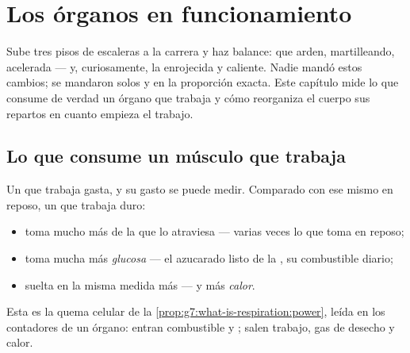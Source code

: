 \chapter{Los órganos en funcionamiento}\label{ch:g7:organs-at-work}

Sube tres pisos de escaleras a la carrera y haz balance:  que
arden,  martilleando,  acelerada --- y, curiosamente,
la  enrojecida y caliente. Nadie mandó estos cambios; se mandaron
solos y en la proporción exacta. Este capítulo mide lo que consume de
verdad un órgano que trabaja y cómo reorganiza el cuerpo sus repartos
en cuanto empieza el trabajo.

\section{Lo que consume un músculo que trabaja}

\begin{proposition}\label{prop:g7:organs-at-work:bill}
Un  que trabaja gasta, y su gasto se puede medir. Comparado con
ese mismo  en reposo, un  que trabaja duro:
\begin{itemize}
  \item toma mucho más \emph{} de la  que lo atraviesa ---
        varias veces lo que toma en reposo;
  \item toma mucha más \emph{glucosa} --- el
         azucarado listo de la , su combustible diario;
  \item suelta en la misma medida más \emph{} --- y
        más \emph{calor}.
\end{itemize}
Esta es la quema celular de la \cref{prop:g7:what-is-respiration:power},
leída en los contadores de un órgano: entran combustible y ;
salen trabajo, gas de desecho y calor.
\end{proposition}
\admitted

